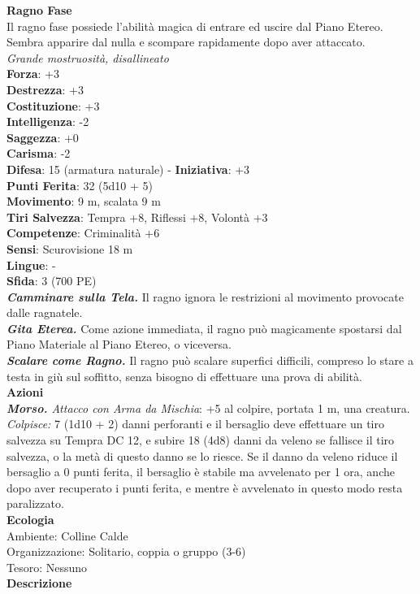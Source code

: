\begin{multicols}{2}
\medskip\textbf{Ragno Fase}\\
Il ragno fase possiede l'abilità magica di entrare ed uscire dal Piano Etereo. Sembra apparire dal nulla e scompare rapidamente dopo aver attaccato.\\
\emph{Grande mostruosità, disallineato}\\
\textbf{Forza}: +3\\
\textbf{Destrezza}: +3\\
\textbf{Costituzione}: +3\\
\textbf{Intelligenza}: -2\\
\textbf{Saggezza}: +0\\
\textbf{Carisma}: -2\\
\textbf{Difesa}: 15 (armatura naturale) - \textbf{Iniziativa}: +3\\
\textbf{Punti Ferita}: 32 (5d10 + 5)\\
\textbf{Movimento}: 9 m, scalata 9 m\\
\textbf{Tiri Salvezza}: Tempra +8, Riflessi +8, Volontà +3 \\
\textbf{Competenze}: Criminalità +6\\
\textbf{Sensi}: Scurovisione 18 m\\
\textbf{Lingue}: -\\
\textbf{Sfida}: 3 (700 PE)\smallskip\\
\emph{\textbf{Camminare sulla Tela.}} Il ragno ignora le restrizioni al movimento provocate dalle ragnatele.\\
\emph{\textbf{Gita Eterea.}} Come azione immediata, il ragno può magicamente spostarsi dal Piano Materiale al Piano Etereo, o viceversa.\\
\emph{\textbf{Scalare come Ragno.}} Il ragno può scalare superfici difficili, compreso lo stare a testa in giù sul soffitto, senza bisogno di effettuare una prova di abilità. \\
\smallskip\textbf{Azioni}\\
\emph{\textbf{Morso.} Attacco con Arma da Mischia}: +5 al colpire, portata 1 m, una creatura.\\
\emph{Colpisce:} 7 (1d10 + 2) danni perforanti e il bersaglio deve effettuare un tiro salvezza su Tempra DC  12, e subire 18 (4d8) danni da veleno se fallisce il tiro salvezza, o la metà di questo danno se lo riesce. Se il danno da veleno riduce il bersaglio a 0 punti ferita, il bersaglio è stabile ma avvelenato per 1 ora, anche dopo aver recuperato i punti ferita, e mentre è avvelenato in questo modo resta paralizzato.\\
\textbf{Ecologia}\\
Ambiente: Colline Calde\\
Organizzazione: Solitario, coppia o gruppo (3-6)\\
Tesoro: Nessuno\\
\textbf{Descrizione}\\


\end{multicols}

